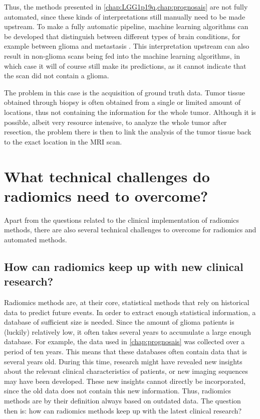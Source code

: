 Thus, the methods presented in \cref{chap:LGG1p19q,chap:prognosais} are not fully automated, since these kinds of interpretations still manually need to be made upstream.
To make a fully automatic pipeline, machine learning algorithms can be developed that distinguish between different types of brain conditions, for example between glioma and metastasis \autocite{chen2019metastatic}.
This interpretation upstream can also result in non-glioma scans being fed into the machine learning algorithms, in which case it will of course still make its predictions, as it cannot indicate that the scan did not contain a glioma.

The problem in this case is the acquisition of ground truth data.
Tumor tissue obtained through biopsy is often obtained from a single or limited amount of locations, thus not containing the information for the whole \gls{tumor}.
Although it is possible, albeit very resource intensive, to analyze the whole \gls{tumor} after resection, the problem there is then to link the analysis of the \gls{tumor} tissue back to the exact location in the \gls{MRI} scan.


\section{What technical challenges do radiomics need to overcome?}\label{sec:discussion_technical}
Apart from the questions related to the clinical implementation of radiomics methods, there are also several technical challenges to overcome for radiomics and automated methods.

\subsection{How can radiomics keep up with new clinical research?}
Radiomics methods are, at their core, statistical methods that rely on historical data to predict future events.
In order to extract enough statistical information, a database of sufficient size is needed.
Since the amount of glioma patients is (luckily) relatively low, it often takes several years to accumulate a large enough database.
For example, the data used in \cref{chap:prognosais} was collected over a period of ten years.
This means that these databases often contain data that is several years old.
During this time, research might have revealed new insights about the relevant clinical characteristics of patients, or new imaging sequences may have been developed.
These new insights cannot directly be incorporated, since the old data does not contain this new information.
Thus, radiomics methods are by their definition always based on outdated data.
The question then is: how can radiomics methods keep up with the latest clinical research?

